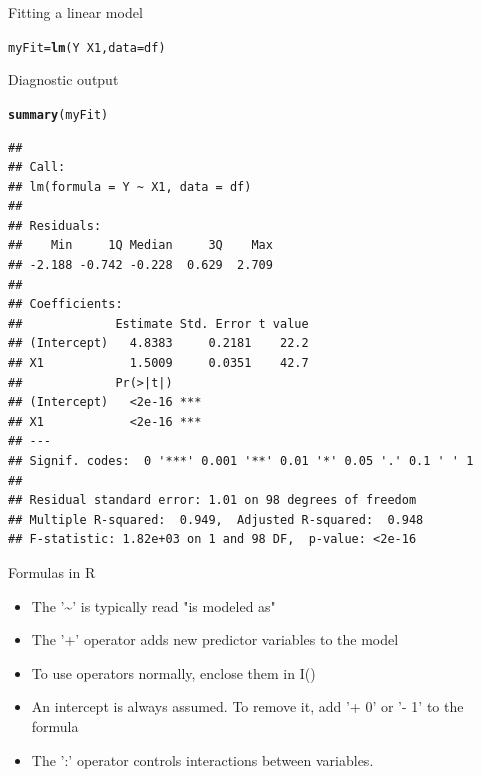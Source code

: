 \documentclass[xcolor=dvipsnames]{beamer}\usepackage{graphicx, color}
\makeatletter
\newcommand{\hlfunctioncall}[1]{\textcolor[rgb]{0.501960784313725,0,0.329411764705882}{\textbf{#1}}}%
\newenvironment{kframe}{%
 \def\at@end@of@kframe{}%
 \ifinner\ifhmode%
  \def\at@end@of@kframe{\end{minipage}}%
  \begin{minipage}{\columnwidth}%
 \fi\fi%
 \def\FrameCommand##1{\hskip\@totalleftmargin \hskip-\fboxsep
 \colorbox{shadecolor}{##1}\hskip-\fboxsep
     \hskip-\linewidth \hskip-\@totalleftmargin \hskip\columnwidth}%
 \MakeFramed {\advance\hsize-\width
   \@totalleftmargin\z@ \linewidth\hsize
   \@setminipage}}%
 {\par\unskip\endMakeFramed%
 \at@end@of@kframe}
\newenvironment{knitrout}{}{} %
\makeatother
\begin{document}
\begin{frame}[fragile]{Fitting a linear model}
\begin{knitrout}
\color{fgcolor}\begin{kframe}
\begin{alltt}
myFit = \hlfunctioncall{lm}(Y ~ X1, data = df)
\end{alltt}
\end{kframe}
\end{knitrout}

\end{frame}

\begin{frame}[fragile]{Diagnostic output}
\begin{knitrout}\tiny
{}\color{fgcolor}\begin{kframe}
\begin{alltt}
\hlfunctioncall{summary}(myFit)
\end{alltt}
\begin{verbatim}
## 
## Call:
## lm(formula = Y ~ X1, data = df)
## 
## Residuals:
##    Min     1Q Median     3Q    Max 
## -2.188 -0.742 -0.228  0.629  2.709 
## 
## Coefficients:
##             Estimate Std. Error t value
## (Intercept)   4.8383     0.2181    22.2
## X1            1.5009     0.0351    42.7
##             Pr(>|t|)    
## (Intercept)   <2e-16 ***
## X1            <2e-16 ***
## ---
## Signif. codes:  0 '***' 0.001 '**' 0.01 '*' 0.05 '.' 0.1 ' ' 1
## 
## Residual standard error: 1.01 on 98 degrees of freedom
## Multiple R-squared:  0.949,	Adjusted R-squared:  0.948 
## F-statistic: 1.82e+03 on 1 and 98 DF,  p-value: <2e-16
\end{verbatim}
\end{kframe}
\end{knitrout}

\end{frame}

\begin{frame}{Formulas in R}
  \begin{itemize}
    \item The '\textasciitilde' is typically read "is modeled as"
    \item The '+' operator adds new predictor variables to the model
    \item To use operators normally, enclose them in I()
    \item An intercept is always assumed. To remove it, add '+ 0' or '- 1' to the formula
    \item The ':' operator controls interactions between variables.
  \end{itemize}
\end{frame}
\end{document}
